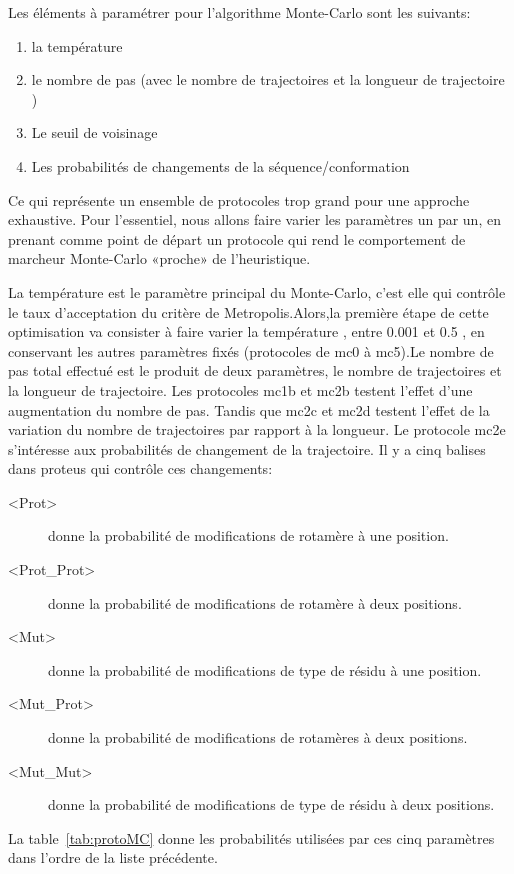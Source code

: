Les éléments à paramétrer pour l'algorithme Monte-Carlo sont les suivants:

\begin{enumerate}
\item la température
\item le nombre de pas (avec le nombre de trajectoires et la longueur de trajectoire )
\item Le seuil de voisinage
\item Les probabilités de changements de la séquence/conformation
\end{enumerate}

Ce qui représente un ensemble de protocoles trop grand pour une approche exhaustive. Pour l'essentiel, nous allons faire varier les paramètres un par un, en prenant comme point de départ un protocole qui rend le comportement de marcheur Monte-Carlo «proche» de l'heuristique.

La température est le paramètre principal du Monte-Carlo, c'est elle qui contrôle le taux d'acceptation du critère de Metropolis.Alors,la première étape de cette optimisation va consister à faire varier la température , entre 0.001 et 0.5 , en conservant les autres paramètres fixés (protocoles de mc0 à mc5).Le nombre de pas total effectué est le produit de deux paramètres, le nombre de trajectoires et la longueur de trajectoire. Les protocoles mc1b et mc2b testent l'effet d'une augmentation du nombre de pas. Tandis que mc2c et mc2d testent l'effet de la variation du nombre de trajectoires par rapport à la longueur.
Le protocole mc2e s'intéresse aux probabilités de changement de la trajectoire. Il y a cinq balises dans proteus qui contrôle ces changements:

\begin{description}
\item[<Prot>] donne la probabilité de modifications de  rotamère à une position.
\item[<Prot\_Prot>] donne la probabilité de modifications de  rotamère à deux positions.
\item[<Mut>] donne la probabilité de modifications de type de résidu à une position.
\item[<Mut\_Prot>] donne la probabilité de modifications de  rotamères à deux positions.
\item[<Mut\_Mut>] donne la probabilité de modifications de type de résidu à deux positions.
\end{description}

La table~\ref{tab:protoMC} donne les probabilités utilisées par ces cinq paramètres dans l'ordre de la liste précédente. 

